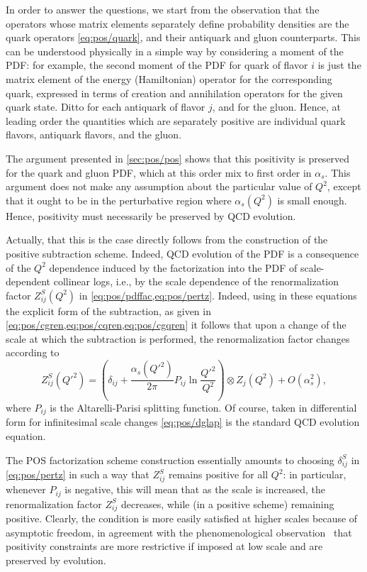 In order to answer the questions, we start from the observation that
the operators whose matrix elements separately define probability densities are
the quark operators \cref{eq:pos/quark}, and their antiquark and gluon
counterparts. This can be understood physically in a simple way by
considering a moment of the PDF: for example, the second moment of the
PDF for quark of flavor $i$ is just the matrix element of the energy
(Hamiltonian) operator for the corresponding quark, expressed in terms
of creation and annihilation operators for the given quark state.
Ditto for each antiquark of
flavor $j$, and for the gluon. Hence, at leading order the quantities
which are separately positive are individual quark flavors, antiquark
flavors, and the gluon.

The argument presented in \cref{sec:pos/pos} shows that this
positivity is preserved for the quark and gluon PDF, which at this
order mix to first order in $\alpha_s$. This argument does not make
any assumption about the particular value of $Q^2$, except that it
ought to be in the perturbative region where $\alpha_s(Q^2)$ is small
enough. Hence, positivity must necessarily be preserved by QCD
evolution.

Actually,  that this is the case directly follows from the construction of the
positive subtraction scheme.
Indeed, QCD evolution of the PDF is a consequence of the $Q^2$
dependence induced by the factorization into the PDF of
scale-dependent collinear logs, i.e., by the scale dependence of the
renormalization factor $Z^S_{ij}(Q^2)$ in
\cref{eq:pos/pdffac,eq:pos/pertz}. 
Indeed, using in these equations the explicit form of the subtraction, as given
in \cref{eq:pos/cgren,eq:pos/cqren,eq:pos/cgqren} it follows that upon a change
of the scale at which the subtraction is performed, the renormalization factor
changes according to
\begin{equation}\label{eq:pos/dglap}
  Z^S_{ij}({Q'}^2)=\left(\delta_{ij}+\frac{\alpha_s({Q'}^2)}{2\pi}P_{ij}\ln\frac{{Q'}^2}{Q^2}\right)\otimes
  Z_j(Q^2) +O(\alpha_s^2),
\end{equation}
where $P_{ij}$ is the Altarelli-Parisi splitting function. Of course,
taken in differential form for infinitesimal scale changes
\cref{eq:pos/dglap} is the standard QCD evolution equation.

The POS factorization scheme construction essentially amounts to
choosing $\delta^{S}_{ij}$ in \cref{eq:pos/pertz} in  such a way that
$Z_{ij}^{S}$ remains positive for all $Q^2$: in particular, whenever
$P_{ij}$ is negative, this will mean that as the scale is increased,
the renormalization factor $Z_{ij}^S$ decreases, while (in a positive
scheme) remaining positive. Clearly, the condition is more easily
satisfied at higher scales because of asymptotic freedom, in agreement
with the phenomenological observation~\cite{Ball:2010de,Ball:2014uwa}
that positivity constraints are more restrictive if imposed at low
scale and are preserved by evolution.

